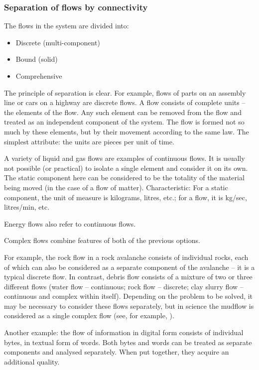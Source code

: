 \documentclass[a4paper,11pt]{article}
\begin{document}
\subsubsection{Separation of flows by connectivity}

The flows in the system are divided into:
\begin{itemize}
\item Discrete (multi-component)
\item Bound (solid)
\item Comprehensive
\end{itemize}
The principle of separation is clear. For example, flows of parts on an
assembly line or cars on a highway are discrete flows. A flow consists of
complete units -- the elements of the flow. Any such element can be removed
from the flow and treated as an independent component of the system. The flow
is formed not so much by these elements, but by their movement according to
the same law. The simplest attribute: the units are pieces per unit of time.

A variety of liquid and gas flows are examples of continuous flows. It is
usually not possible (or practical) to isolate a single element and consider
it on its own. The static component here can be considered to be the totality
of the material being moved (in the case of a flow of matter). Characteristic:
For a static component, the unit of measure is kilograms, litres, etc.; for a
flow, it is kg/sec, litres/min, etc.

Energy flows also refer to continuous flows.

Complex flows combine features of both of the previous options.

For example, the rock flow in a rock avalanche consists of individual rocks,
each of which can also be considered as a separate component of the avalanche
-- it is a typical discrete flow. In contrast, debris flow consists of a
mixture of two or three different flows (water flow -- continuous; rock flow
-- discrete; clay slurry flow -- continuous and complex within itself).
Depending on the problem to be solved, it may be necessary to consider these
flows separately, but in science the mudflow is considered as a single complex
flow (see, for example, \cite{B18}).

Another example: the flow of information in digital form consists of
individual bytes, in textual form of words. Both bytes and words can be
treated as separate components and analysed separately. When put together,
they acquire an additional quality.
\end{document}
